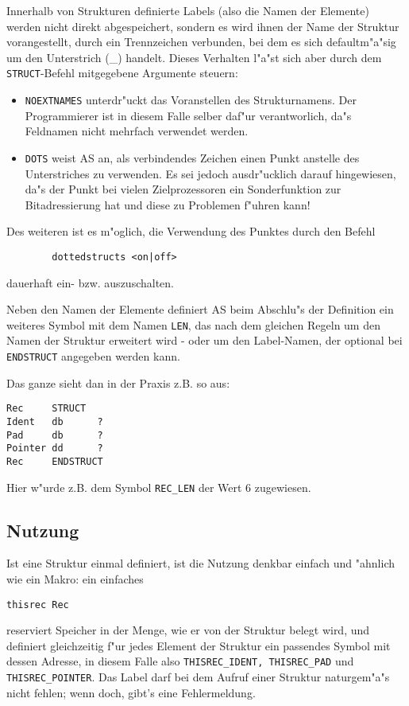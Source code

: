 \documentclass[12pt,a4paper,twoside]{report}
\newcommand{\tty}[1]{{\tt #1}}
\begin{document}
{Innerhalb von Strukturen definierte Labels (also die Namen der Elemente)
werden nicht direkt abgespeichert, sondern es wird ihnen der Name der
Struktur vorangestellt, durch ein Trennzeichen verbunden, bei dem es sich
defaultm"a"sig um den Unterstrich (\_) handelt.  Dieses Verhalten l"a"st
sich aber durch dem \tty{STRUCT}-Befehl mitgegebene Argumente steuern:
\begin{itemize}
\item{\tty{NOEXTNAMES} unterdr"uckt das Voranstellen des Strukturnamens.
      Der Programmierer ist in diesem Falle selber daf"ur verantworlich,
      da"s Feldnamen nicht mehrfach verwendet werden.}
\item{\tty{DOTS} weist AS an, als verbindendes Zeichen einen Punkt
      anstelle des Unterstriches zu verwenden.  Es sei jedoch
      ausdr"ucklich darauf hingewiesen, da"s der Punkt bei vielen
      Zielprozessoren ein Sonderfunktion zur Bitadressierung hat und
      diese zu Problemen f"uhren kann!}
\end{itemize}
Des weiteren ist es m"oglich, die Verwendung des Punktes durch den Befehl
\begin{verbatim}
        dottedstructs <on|off>
\end{verbatim}
dauerhaft ein- bzw. auszuschalten.

Neben den Namen der Elemente definiert AS beim Abschlu"s der Definition
ein weiteres Symbol mit dem Namen {\tt LEN}, das nach dem gleichen Regeln
um den Namen der Struktur erweitert wird - oder um den Label-Namen, der
optional bei \tty{ENDSTRUCT} angegeben werden kann.

Das ganze sieht dan in der Praxis z.B. so aus:
\begin{verbatim}
Rec     STRUCT
Ident   db      ?
Pad     db      ?
Pointer dd      ?
Rec     ENDSTRUCT
\end{verbatim}
Hier w"urde z.B. dem Symbol {\tt REC\_LEN} der Wert 6 zugewiesen.

\subsection{Nutzung}

Ist eine Struktur einmal definiert, ist die Nutzung denkbar einfach und
"ahnlich wie ein Makro: ein einfaches
\begin{verbatim}
thisrec Rec
\end{verbatim}
reserviert Speicher in der Menge, wie er von der Struktur belegt wird, und
definiert gleichzeitig f"ur jedes Element der Struktur ein passendes
Symbol mit dessen Adresse, in diesem Falle also {\tt THISREC\_IDENT,
THISREC\_PAD} und {\tt THISREC\_POINTER}.  Das Label darf bei dem Aufruf
einer Struktur naturgem"a"s nicht fehlen; wenn doch, gibt's eine
Fehlermeldung.

}
\end{document}
